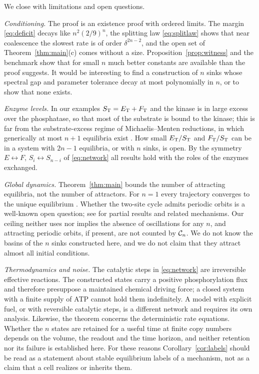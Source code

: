 We close with limitations and open questions.

\emph{Conditioning.} The proof is an existence proof with ordered limits. The margin
\eqref{eq:deficit} decays like \(n^2(2/9)^n\), the splitting law \eqref{eq:splitlaw} shows that
near coalescence the slowest rate is of order \(\delta^{2n-2}\), and the open set of
Theorem~\ref{thm:main}(c) comes without a size. Proposition~\ref{prop:witness} and the
benchmark show that for small \(n\) much better constants are available than the proof
suggests. It would be interesting to find a construction of \(n\) sinks whose spectral gap and
parameter tolerance decay at most polynomially in \(n\), or to show that none exists.

\emph{Enzyme levels.} In our examples \(S_{\mathrm T}=E_{\mathrm T}+F_{\mathrm T}\) and the kinase is in large excess over
the phosphatase, so that most of the substrate is bound to the kinase; this is far from the
substrate-excess regime of Michaelis--Menten reductions, in which generically at most \(n+1\)
equilibria exist \cite[Theorem~4]{WangSontag2008}. How small \(E_{\mathrm T}/S_{\mathrm T}\) and \(F_{\mathrm T}/S_{\mathrm T}\) can be
in a system with \(2n-1\) equilibria, or with \(n\) sinks, is open. By the symmetry
\(E\leftrightarrow F\), \(S_i\leftrightarrow S_{n-i}\) of \eqref{eq:network} all results hold
with the roles of the enzymes exchanged.

\emph{Global dynamics.} Theorem~\ref{thm:main} bounds the number of attracting equilibria, not
the number of attractors. For \(n=1\) every trajectory converges to the unique equilibrium
\cite{AngeliSontag2008}. Whether the two-site cycle admits periodic orbits is a
well-known open question; see \cite{CMS2019,CFM2020,ConradiMincheva2024} for partial results
and related mechanisms. Our ceiling neither uses nor implies the absence of oscillations for
any \(n\), and attracting periodic orbits, if present, are not counted by \(\mathcal C_n\). We do not
know the basins of the \(n\) sinks constructed here, and we do
not claim that they attract almost all initial conditions.

\emph{Thermodynamics and noise.} The catalytic steps in \eqref{eq:network} are irreversible
effective reactions. The constructed states carry a positive phosphorylation flux and
therefore presuppose a maintained chemical driving force; a closed system with a finite supply
of ATP cannot hold them indefinitely. A model with explicit fuel, or with reversible catalytic
steps, is a different network and requires its own analysis. Likewise, the theorem concerns
the deterministic rate equations. Whether the \(n\) states are retained for a useful time at
finite copy numbers depends on the volume, the readout and the time horizon, and neither
retention nor its failure is established here. For these reasons Corollary~\ref{cor:labels}
should be read as a statement about stable equilibrium labels of a mechanism, not as a claim
that a cell realizes or inherits them.

